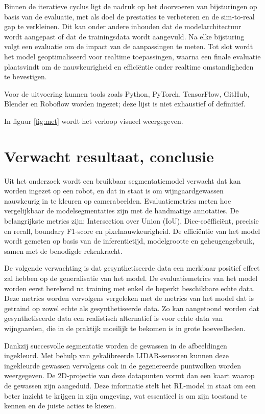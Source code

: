 Binnen de iteratieve cyclus ligt de nadruk op het doorvoeren van bijsturingen op basis van de evaluatie, met als doel de prestaties te verbeteren en de sim-to-real gap te verkleinen. Dit kan onder andere inhouden dat de modelarchitectuur wordt aangepast of dat de trainingsdata wordt aangevuld. Na elke bijsturing volgt een evaluatie om de impact van de aanpassingen te meten. Tot slot wordt het model geoptimaliseerd voor realtime toepassingen, waarna een finale evaluatie plaatsvindt om de nauwkeurigheid en efficiëntie onder realtime omstandigheden te bevestigen.

Voor de uitvoering kunnen tools zoals Python, PyTorch, TensorFlow, GitHub, Blender en Roboflow worden ingezet; deze lijst is niet exhaustief of definitief.

In figuur \ref{fig:met} wordt het verloop visueel weergegeven.



\section{Verwacht resultaat, conclusie}%
\label{sec:verwachte_resultaten}

Uit het onderzoek wordt een bruikbaar segmentatiemodel verwacht dat kan worden ingezet op een robot, en dat in staat is om wijngaardgewassen nauwkeurig in te kleuren op camerabeelden. Evaluatiemetrics meten hoe vergelijkbaar de modelsegmentaties zijn met de handmatige annotaties. De belangrijkste metrics zijn: Intersection over Union (IoU), Dice-coëfficiënt, precisie en recall, boundary F1-score en pixelnauwkeurigheid. De efficiëntie van het model wordt gemeten op basis van de inferentietijd, modelgrootte en geheugengebruik, samen met de benodigde rekenkracht.

De volgende verwachting is dat gesynthetiseerde data een merkbaar positief effect zal hebben op de generalisatie van het model. De evaluatiemetrics van het model worden eerst berekend na training met enkel de beperkt beschikbare echte data. Deze metrics worden vervolgens vergeleken met de metrics van het model dat is getraind op zowel echte als gesynthetiseerde data. Zo kan aangetoond worden dat gesynthetiseerde data een realistisch alternatief is voor echte data van wijngaarden, die in de praktijk moeilijk te bekomen is in grote hoeveelheden.

Dankzij succesvolle segmentatie worden de gewassen in de afbeeldingen ingekleurd. Met behulp van gekalibreerde LIDAR-sensoren kunnen deze ingekleurde gewassen vervolgens ook in de gegenereerde puntwolken worden weergegeven. De 2D-projectie van deze datapunten vormt dan een kaart waarop de gewassen zijn aangeduid. Deze informatie stelt het RL-model in staat om een beter inzicht te krijgen in zijn omgeving, wat essentieel is om zijn toestand te kennen en de juiste acties te kiezen.